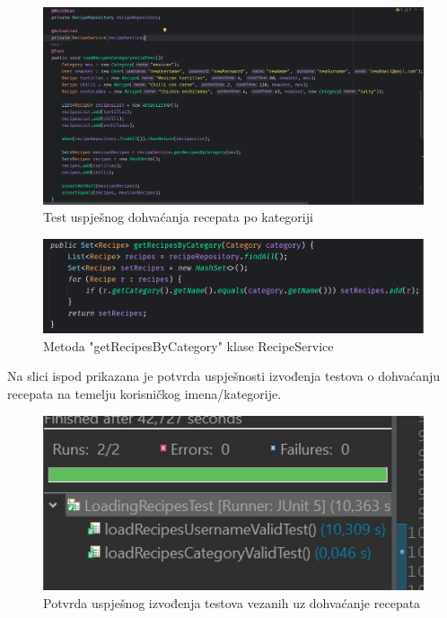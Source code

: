 				\begin{figure}[H]
			\includegraphics[scale=0.4]{slike/loadRecipesCategoryValidTest.PNG} %
			\centering
			\caption{Test uspješnog dohvaćanja recepata po kategoriji}
			\label{Test uspješnog dohvaćanja recepata po kategoriji}
		\end{figure}
		
			\begin{figure}[H]
			\includegraphics[scale=0.4]{slike/getRecipesByCategory.PNG} %
			\centering
			\caption{Metoda "getRecipesByCategory" klase RecipeService}
			\label{Metoda "getRecipesByCategory" klase RecipeService}
		\end{figure}
		
		Na slici ispod prikazana je potvrda uspješnosti izvođenja testova o dohvaćanju recepata na temelju korisničkog imena/kategorije.
		
		\begin{figure}[H]
			\includegraphics[scale=0.4]{slike/JUnit_loadRecipes.JPG} %
			\centering
			\caption{Potvrda uspješnog izvođenja testova vezanih uz dohvaćanje recepata}
			\label{Potvrda uspješnog izvođenja testova vezanih uz dohvaćanje recepata}
		\end{figure}

